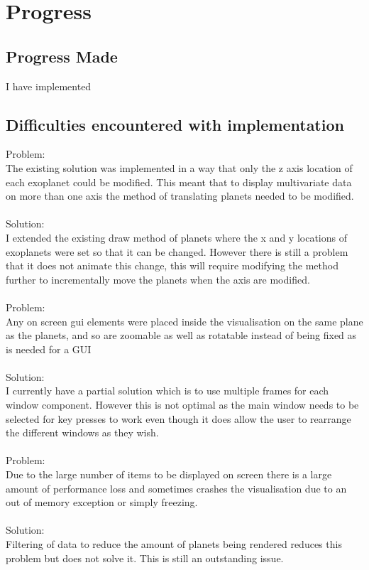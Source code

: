 \documentclass[11pt
              , a4paper
              , twoside
              , openright
              ]{report}
\begin{document}
\chapter{Progress}

\section{Progress Made}
I have implemented 
\section{Difficulties encountered with implementation}
Problem:\\
The existing solution was implemented in a way that only the z axis location of each exoplanet could be modified. This meant that to display multivariate data on more than one axis the method of translating planets needed to be modified.
\\\\
Solution:\\
I extended the existing draw method of planets where the x and y locations of exoplanets were set so that it can be changed. However there is still a problem that it does not animate this change, this will require modifying the method further to incrementally move the planets when the axis are modified.
\\\\
Problem:\\
Any on screen gui elements were placed inside the visualisation on the same plane as the planets, and so are zoomable as well as rotatable instead of being fixed as is needed for a GUI
\\\\
Solution:\\
I currently have a partial solution which is to use multiple frames for each window component. However this is not optimal as the main window needs to be selected for key presses to work even though it does allow the user to rearrange the different windows as they wish. 
\\\\
Problem: \\
Due to the large number of items to be displayed on screen there is a large amount of performance loss and sometimes crashes the visualisation due to an out of memory exception or simply freezing.
\\\\
Solution:\\
Filtering of data to reduce the amount of planets being rendered reduces this problem but does not solve it. This is still an outstanding issue.
\end{document}
